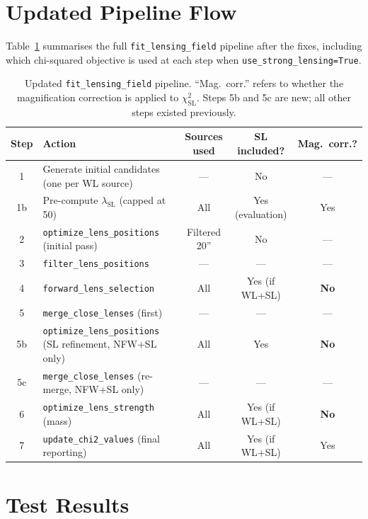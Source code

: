 \documentclass[12pt]{article}
\begin{document}
\section{Updated Pipeline Flow}
\label{sec:pipeline}

Table~\ref{tab:pipeline} summarises the full \texttt{fit\_lensing\_field} pipeline after
the fixes, including which chi-squared objective is used at each step when
\texttt{use\_strong\_lensing=True}.

\begin{table}[h!]
\centering
\caption{Updated \texttt{fit\_lensing\_field} pipeline.  ``Mag.\ corr.'' refers to whether
the magnification correction is applied to $\chi^2_\mathrm{SL}$.  Steps 5b and 5c are new;
all other steps existed previously.}
\label{tab:pipeline}
\small
\begin{tabular}{clccc}
  \toprule
  Step & Action & Sources used & SL included? & Mag.\ corr.?\\
  \midrule
  1 & Generate initial candidates (one per WL source) & --- & No & ---\\
  1b & Pre-compute $\lambda_\mathrm{SL}$ (capped at 50) & All & Yes (evaluation) & Yes\\
  2 & \texttt{optimize\_lens\_positions} (initial pass) & Filtered 20'' & No & ---\\
  3 & \texttt{filter\_lens\_positions} & --- & --- & ---\\
  4 & \texttt{forward\_lens\_selection} & All & Yes (if WL+SL) & \textbf{No}\\
  5 & \texttt{merge\_close\_lenses} (first) & --- & --- & ---\\
  5b & \texttt{optimize\_lens\_positions} (SL refinement, NFW+SL only) & All & Yes & \textbf{No}\\
  5c & \texttt{merge\_close\_lenses} (re-merge, NFW+SL only) & --- & --- & ---\\
  6 & \texttt{optimize\_lens\_strength} (mass) & All & Yes (if WL+SL) & \textbf{No}\\
  7 & \texttt{update\_chi2\_values} (final reporting) & All & Yes (if WL+SL) & Yes\\
  \bottomrule
\end{tabular}
\end{table}

\section{Test Results}
\label{sec:tests}
\end{document}
